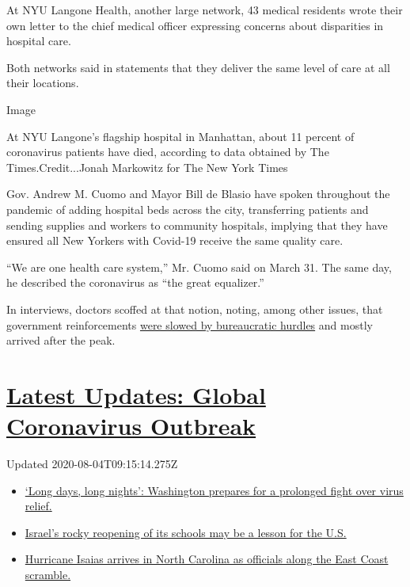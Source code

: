 At NYU Langone Health, another large network, 43 medical residents wrote
their own letter to the chief medical officer expressing concerns about
disparities in hospital care.

Both networks said in statements that they deliver the same level of
care at all their locations.

Image

At NYU Langone's flagship hospital in Manhattan, about 11 percent of
coronavirus patients have died, according to data obtained by The
Times.Credit...Jonah Markowitz for The New York Times

Gov. Andrew M. Cuomo and Mayor Bill de Blasio have spoken throughout the
pandemic of adding hospital beds across the city, transferring patients
and sending supplies and workers to community hospitals, implying that
they have ensured all New Yorkers with Covid-19 receive the same quality
care.

``We are one health care system,'' Mr. Cuomo said on March 31. The same
day, he described the coronavirus as ``the great equalizer.''

In interviews, doctors scoffed at that notion, noting, among other
issues, that government reinforcements
\href{https://www.nytimes.com/2020/04/08/nyregion/coronavirus-new-york-volunteers.html}{were
slowed by bureaucratic hurdles} and mostly arrived after the peak.

\hypertarget{latest-updates-global-coronavirus-outbreak}{%
\section{\texorpdfstring{\href{https://www.nytimes.com/2020/08/04/world/coronavirus-covid-19.html?action=click\&pgtype=Article\&state=default\&region=MAIN_CONTENT_1\&context=storylines_live_updates}{Latest
Updates: Global Coronavirus
Outbreak}}{Latest Updates: Global Coronavirus Outbreak}}\label{latest-updates-global-coronavirus-outbreak}}

Updated 2020-08-04T09:15:14.275Z

\begin{itemize}
\tightlist
\item
  \href{https://www.nytimes.com/2020/08/04/world/coronavirus-covid-19.html?action=click\&pgtype=Article\&state=default\&region=MAIN_CONTENT_1\&context=storylines_live_updates\#link-6b644638}{`Long
  days, long nights': Washington prepares for a prolonged fight over
  virus relief.}
\item
  \href{https://www.nytimes.com/2020/08/04/world/coronavirus-covid-19.html?action=click\&pgtype=Article\&state=default\&region=MAIN_CONTENT_1\&context=storylines_live_updates\#link-7af9fca0}{Israel's
  rocky reopening of its schools may be a lesson for the U.S.}
\item
  \href{https://www.nytimes.com/2020/08/04/world/coronavirus-covid-19.html?action=click\&pgtype=Article\&state=default\&region=MAIN_CONTENT_1\&context=storylines_live_updates\#link-33bf9168}{Hurricane
  Isaias arrives in North Carolina as officials along the East Coast
  scramble.}
\end{itemize}

